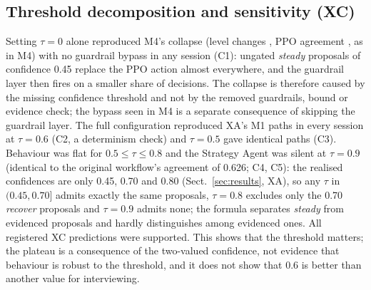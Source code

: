 \subsection{Threshold decomposition and sensitivity (XC)}
\begin{table}[tbp]
\centering\scriptsize\setlength{\tabcolsep}{3pt}
\caption{XC (REPLAY, 160 sessions per row, mean per session): only $\tau$ changes; evidence requirement, one-step bound and guardrails stay in force. chg./rev.: level changes and reversals; agr.: share of RL-phase decisions equal to the PPO action; strat.: decisions whose final source is the Strategy Agent; gfire: guardrail firings; byp.: sessions with a guardrail bypass. Cluster-bootstrap intervals over the 8 recorded-answer sessions are in the released summary file.}\label{tab:xc}

\end{table}
Setting $\tau=0$ alone reproduced M4's collapse (level changes \xctauzerochg{}, PPO agreement \xctauzeroagr{}, as in M4) with no guardrail bypass in any session (C1): ungated \emph{steady} proposals of confidence 0.45 replace the PPO action almost everywhere, and the guardrail layer then fires on a smaller share of decisions. The collapse is therefore caused by the missing confidence threshold and not by the removed guardrails, bound or evidence check; the bypass seen in M4 is a separate consequence of skipping the guardrail layer. The full configuration reproduced XA's M1 paths in every session at $\tau=0.6$ (C2, a determinism check) and $\tau=0.5$ gave identical paths (C3). Behaviour was flat for $0.5\le\tau\le0.8$ and the Strategy Agent was silent at $\tau=0.9$ (identical to the original workflow's agreement of 0.626; C4, C5): the realised confidences are only 0.45, 0.70 and 0.80 (Sect.~\ref{sec:results}, XA), so any $\tau$ in $(0.45,0.70]$ admits exactly the same proposals, $\tau=0.8$ excludes only the 0.70 \emph{recover} proposals and $\tau=0.9$ admits none; the formula separates \emph{steady} from evidenced proposals and hardly distinguishes among evidenced ones. All \xcsupported{} registered XC predictions were supported. This shows that the threshold matters; the plateau is a consequence of the two-valued confidence, not evidence that behaviour is robust to the threshold, and it does not show that 0.6 is better than another value for interviewing.

